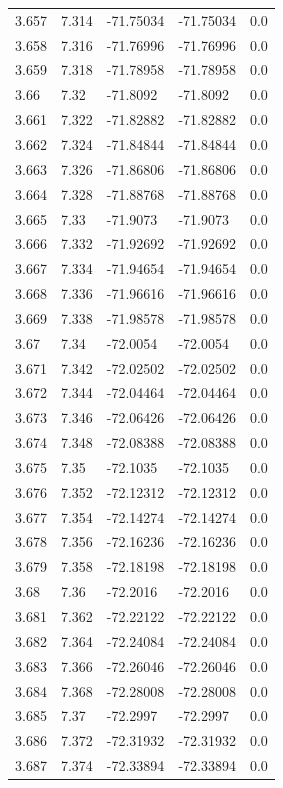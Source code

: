 \begin{tabular}{lllll}
3.657 & 7.314 & -71.75034 & -71.75034 & 0.0 \\
3.658 & 7.316 & -71.76996 & -71.76996 & 0.0 \\
3.659 & 7.318 & -71.78958 & -71.78958 & 0.0 \\
3.66 & 7.32 & -71.8092 & -71.8092 & 0.0 \\
3.661 & 7.322 & -71.82882 & -71.82882 & 0.0 \\
3.662 & 7.324 & -71.84844 & -71.84844 & 0.0 \\
3.663 & 7.326 & -71.86806 & -71.86806 & 0.0 \\
3.664 & 7.328 & -71.88768 & -71.88768 & 0.0 \\
3.665 & 7.33 & -71.9073 & -71.9073 & 0.0 \\
3.666 & 7.332 & -71.92692 & -71.92692 & 0.0 \\
3.667 & 7.334 & -71.94654 & -71.94654 & 0.0 \\
3.668 & 7.336 & -71.96616 & -71.96616 & 0.0 \\
3.669 & 7.338 & -71.98578 & -71.98578 & 0.0 \\
3.67 & 7.34 & -72.0054 & -72.0054 & 0.0 \\
3.671 & 7.342 & -72.02502 & -72.02502 & 0.0 \\
3.672 & 7.344 & -72.04464 & -72.04464 & 0.0 \\
3.673 & 7.346 & -72.06426 & -72.06426 & 0.0 \\
3.674 & 7.348 & -72.08388 & -72.08388 & 0.0 \\
3.675 & 7.35 & -72.1035 & -72.1035 & 0.0 \\
3.676 & 7.352 & -72.12312 & -72.12312 & 0.0 \\
3.677 & 7.354 & -72.14274 & -72.14274 & 0.0 \\
3.678 & 7.356 & -72.16236 & -72.16236 & 0.0 \\
3.679 & 7.358 & -72.18198 & -72.18198 & 0.0 \\
3.68 & 7.36 & -72.2016 & -72.2016 & 0.0 \\
3.681 & 7.362 & -72.22122 & -72.22122 & 0.0 \\
3.682 & 7.364 & -72.24084 & -72.24084 & 0.0 \\
3.683 & 7.366 & -72.26046 & -72.26046 & 0.0 \\
3.684 & 7.368 & -72.28008 & -72.28008 & 0.0 \\
3.685 & 7.37 & -72.2997 & -72.2997 & 0.0 \\
3.686 & 7.372 & -72.31932 & -72.31932 & 0.0 \\
3.687 & 7.374 & -72.33894 & -72.33894 & 0.0 \\

\end{tabular}

